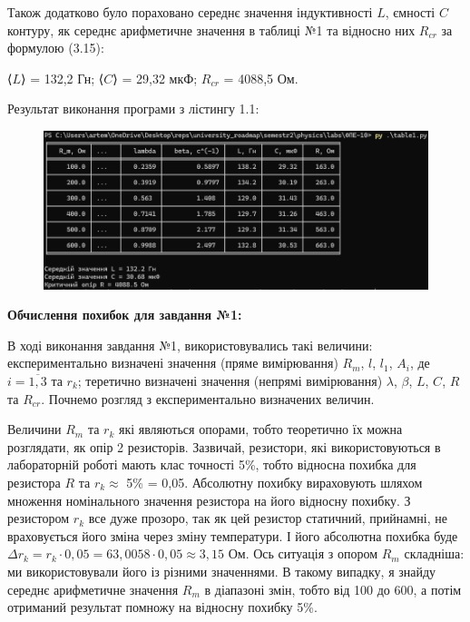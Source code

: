 \documentclass[12pt,a4paper]{article}
\begin{document}
    Також додатково було пораховано середнє значення індуктивності $L$, ємності $C$ контуру, як середнє арифметичне значення в таблиці №1 та відносно них
    $R_{cr}$ за формулою (3.15):

    \vspace{1em} %
    \setlength{\parindent}{0pt}

    ⟨$L$⟩ = 132,2 Гн; ⟨$C$⟩ = 29,32 мкФ;   $R_{cr}$ = 4088,5 Ом.

    \newpage

    Результат виконання програми з лістингу 1.1:

    \begin{figure}[ht]
        \centering
        \includegraphics[width=1\textwidth]{table1_results.png}
    \end{figure}

    \vspace{1em} %

    \textbf{\large Обчислення похибок для завдання №1:}

    \vspace{1em} %
    \setlength{\parindent}{1.5em}

    В ході виконання завдання №1, використовувались такі величини: експериментально визначені значення (пряме вимірювання) $R_m$, $l$, $l_1$, $A_i$, де $i = \overline{1, 3}$ та $r_k$;
    теретично визначені значення (непрямі вимірювання) $\lambda$, $\beta$, $L$, $C$, $R$ та $R_{cr}$. Почнемо розгляд з експериментально визначених величин.

    Величини $R_m$ та $r_k$ які являються опорами, тобто теоретично їх можна розглядати, як опір 2 резисторів. Зазвичай, резистори,
    які використовуються в лабораторній роботі мають клас точності 5\%, тобто відносна похибка для резистора $R$ та $r_k \approx$ 5\% = 0,05. Абсолютну похибку
    вираховують шляхом множення номінального значення резистора на його відносну похибку. З резистором $r_k$ все дуже прозоро, так як цей резистор статичний, прийнамні, не враховується його зміна через зміну температури.
    І його абсолютна похибка буде $\Delta r_k = r_k \cdot 0,05 = 63,0058 \cdot 0,05 \approx 3,15$ Ом. Ось ситуація з опором $R_m$ складніша: ми використовували його із різними значеннями.
    В такому випадку, я знайду середнє арифметичне значення $R_m$ в діапазоні змін, тобто від 100 до 600, а потім отриманий результат помножу на відносну похибку 5\%.
\end{document}

